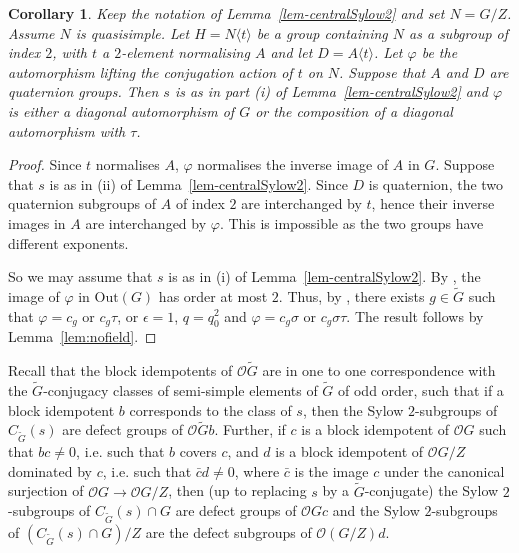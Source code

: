 \documentclass{amsart}
\theoremstyle{plain}\newtheorem{Theorem}{Theorem}[section]
\theoremstyle{plain}\newtheorem{Conjecture}[Theorem]{Conjecture}
\theoremstyle{plain}\newtheorem{Corollary}[Theorem]{Corollary}
\theoremstyle{plain}\newtheorem{Lemma}[Theorem]{Lemma}
\theoremstyle{plain}\newtheorem{Proposition}[Theorem]{Proposition}
\theoremstyle{definition}\newtheorem{Definition}[Theorem]{Definition}
\theoremstyle{definition}\newtheorem{Example}[Theorem]{Example}
\theoremstyle{definition}\newtheorem{Examples}[Theorem]{Examples}
\theoremstyle{definition}\newtheorem{Exercise}[Theorem]{Exercise}
\theoremstyle{definition}\newtheorem{Notation}[Theorem]{Notation}
\theoremstyle{definition}\newtheorem{Remark}[Theorem]{Remark}
\theoremstyle{definition}\newtheorem{Remarks}[Theorem]{Remarks}
\def\CO{{\mathcal{O}}}    \def\OPE{{\mathcal{O}(P\rtimes E)}}
\def\Out{\mathrm{Out}}
\newcommand{\wt}{\widetilde}
\numberwithin{equation}{section}
\begin{document}
\begin{Corollary} \label{non-stable2}   Keep the notation of Lemma~\ref{lem-centralSylow2}  and set  $N=G/Z$. Assume $N$ is quasisimple.  Let $H = N  \langle t \rangle $ be  a group containing $N$ as a subgroup of index $2$, with  $t$ a $2$-element normalising  $A$ and  let $D= A\langle t \rangle $. Let $\varphi $ be   the automorphism lifting the conjugation  action of $t$  on $ N$.   Suppose that  $A$ and $D$  are quaternion groups. 
Then  $s$  is as in  part (i) of Lemma~\ref{lem-centralSylow2} and 
$\varphi$  is either a diagonal  automorphism  of $G$  or the composition of a diagonal automorphism with $\tau $.
\end{Corollary}

\begin{proof}  Since  $t$  normalises $A$, $\varphi $  normalises  the inverse image of $A$ in $G$.  
Suppose that  $s$  is as in (ii)  of Lemma~\ref{lem-centralSylow2}.    Since $D$ is quaternion, the two  quaternion subgroups of $A$   of index $2$  are  interchanged by $t$, hence their inverse images  in $A$ are interchanged by $\varphi $.  This is impossible  as the two  groups have different exponents. 

So we may assume that $s$ is as in (i) of  Lemma~\ref{lem-centralSylow2}.  By \cite[Thm.~2.5.14]{GLS3}, the image of $\varphi $ in $\Out(G)$  has order at most $2$. Thus, by  \cite[Thms.~2.5.12,~2.5.14]{GLS3}, there exists  $g \in \wt{G}$  such that $\varphi= c_g $ or  $c_g\tau$, or $\epsilon=1$, $q=q_0^2$ and $\varphi =c_g \sigma$ or $c_g \sigma\tau$.   
The result follows by Lemma~\ref{lem:nofield}.
\end{proof} 

Recall that the block idempotents   of $\CO \wt{G} $ are in one to one correspondence with the $\wt{G}$-conjugacy classes of  semi-simple elements of $\wt{G}$ of  odd order, such that if a block  idempotent $b$ corresponds to    the class of $s$, then   the Sylow $2$-subgroups  of $C_{\wt{G}}(s)$  are defect groups of $\CO \wt{G}b$. Further, if $c$  is a block idempotent of   $\CO G $  such that $bc \ne 0$, i.e.  such that $b$ covers $c$,   and $d$ is a block idempotent of $\CO  G/Z $ dominated by $c$, i.e. such that  $\bar c d \ne 0$, where $\bar c$ is the image  $c$ under the canonical surjection of $\CO G\to \CO G/Z$, then (up to replacing $s$ by a $\wt{G}$-conjugate) the Sylow $2$-subgroups  of $C_{\wt{G}}(s) \cap G $ are defect groups of  $\CO G c$ and the Sylow $2$-subgroups of $(C_{\wt{G}}(s) \cap G)/Z $ are  the defect subgroups of $\CO (G/Z) d$.
\end{document}
